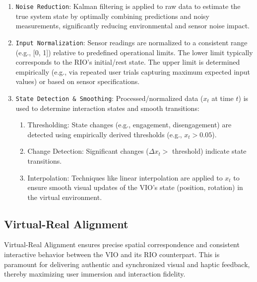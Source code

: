 \begin{enumerate}
  \item \texttt{Noise Reduction}: Kalman filtering is applied to raw data to estimate the true system state by optimally combining predictions and noisy measurements, significantly reducing environmental and sensor noise impact.

  \item \texttt{Input Normalization}: Sensor readings are normalized to a consistent range (e.g., [0, 1]) relative to predefined operational limits. The lower limit typically corresponds to the RIO's initial/rest state. The upper limit is determined empirically (e.g., via repeated user trials capturing maximum expected input values) or based on sensor specifications.

  \item \texttt{State Detection \& Smoothing}: Processed/normalized data ($x_t$ at time $t$) is used to determine interaction states and smooth transitions:
  
  \begin{enumerate}
    \item Thresholding: State changes (e.g., engagement, disengagement) are detected using empirically derived thresholds (e.g., $x_t > 0.05$).

    \item Change Detection: Significant changes ($\Delta x_t >$ threshold) indicate state transitions.

    \item Interpolation: Techniques like linear interpolation are applied to $x_t$ to ensure smooth visual updates of the VIO's state (position, rotation) in the virtual environment.
  \end{enumerate}

\end{enumerate}

\subsection{Virtual-Real Alignment}
Virtual-Real Alignment ensures precise spatial correspondence and consistent interactive behavior between the VIO and its RIO counterpart. This is paramount for delivering authentic and synchronized visual and haptic feedback, thereby maximizing user immersion and interaction fidelity.

